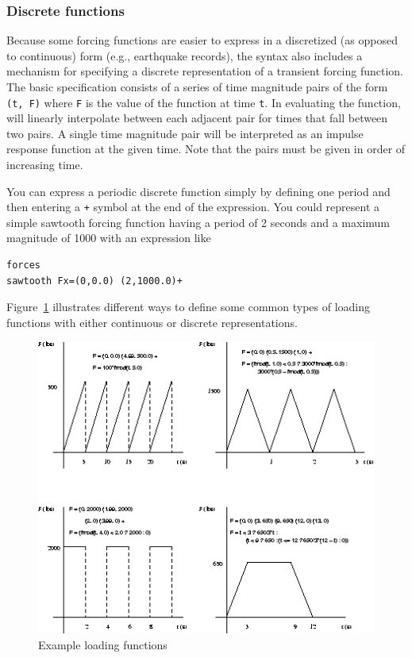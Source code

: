 \subsubsection{Discrete functions}
Because some forcing functions are easier to express in a discretized (as 
opposed to continuous) form (e.g., earthquake records), the \felt{} syntax
also includes a mechanism for specifying a discrete representation of a 
transient forcing function.  The basic specification consists of a series of 
time magnitude pairs of the form {\tt (t, F)} where {\tt F} is the value of the
function at time {\tt t}.  In evaluating the function, \felt{} will linearly
interpolate between each adjacent pair for times that fall between two pairs.
A single time magnitude pair will be interpreted as an impulse response
function at the given time.  Note that the pairs must be given in order of 
increasing time.

You can express a periodic discrete function simply by defining one
period and then entering a {\tt +} symbol at the end of the expression.  
You could represent a simple sawtooth forcing function having a period of 
2 seconds and a maximum magnitude of 1000 with an expression like 
\begin{screen}
 \begin{verbatim}
forces
sawtooth Fx=(0,0.0) (2,1000.0)+
 \end{verbatim}
\end{screen}
Figure~\ref{problem.sawtooth} illustrates different ways
to define some common types of loading functions with either continuous
or discrete representations.

\begin{figure}[htb]
 \begin{center}
  \includegraphics[width=6in]{figures/sawtooth}
 \end{center}
 \caption{Example loading functions}
 \label{problem.sawtooth}
\end{figure}

